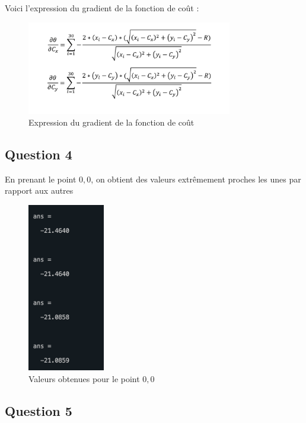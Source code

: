 \documentclass[12pt]{article}
\begin{document}
Voici l'expression du gradient de la fonction de coût :
\begin{figure}[H]
    \centering
    \includegraphics[width=0.8\textwidth]{Q3.png} 
    \caption{Expression du gradient de la fonction de coût}
\end{figure}

\subsection{Question 4}
En prenant le point \(0,0\), on obtient des valeurs extrêmement proches les unes par rapport aux autres
\begin{figure}[H]
    \centering
    \includegraphics[width=0.3\textwidth]{Q4.png} 
    \caption{Valeurs obtenues pour le point \(0,0\)}
\end{figure}

\subsection{Question 5}
\end{document}
